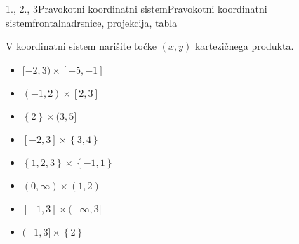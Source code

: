 \begin{priprava}{1., 2., 3}{}{Pravokotni koordinatni sistem}{Pravokotni koordinatni sistem}{frontalna}{drsnice, projekcija, tabla}
\begin{naloga}
    V koordinatni sistem narišite točke $(x,y)$ kartezičnega produkta.
    \begin{itemize}
        \item $[-2,3)\times[-5,-1]$
        \item $(-1,2)\times[2,3]$
        \item $\left\{2\right\}\times(3,5]$
        \item $[-2,3]\times\left\{3,4\right\}$
        \item $\left\{1,2,3\right\}\times\left\{-1,1\right\}$
        \item $(0,\infty)\times(1,2)$
        \item $[-1,3]\times(-\infty,3]$
        \item $(-1,3]\times\left\{2\right\}$
    \end{itemize}
\end{naloga}



\end{priprava}